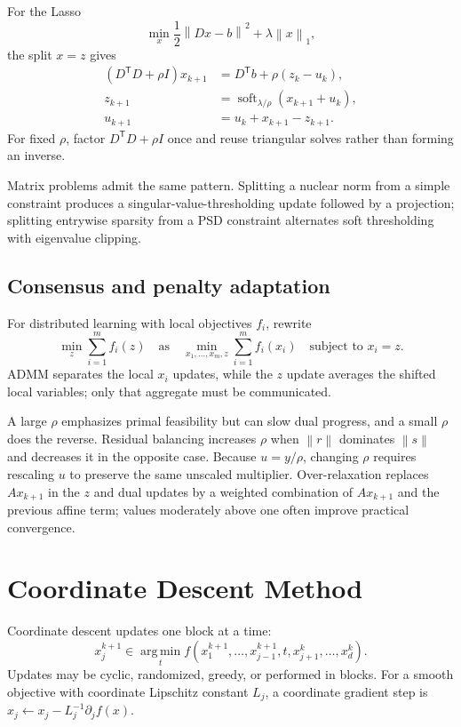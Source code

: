 \documentclass[12pt,oneside]{book}
\numberwithin{equation}{section}
\theoremstyle{definition}
\theoremstyle{plain}
\theoremstyle{remark}
\newcommand{\argmin}{\operatorname*{arg\,min}}
\newcommand{\norm}[1]{\left\lVert #1 \right\rVert}
\begin{document}
For the Lasso
\[
 \min_x\frac12\norm{Dx-b}^2+\lambda\norm{x}_1,
\]
the split $x=z$ gives
\begin{align*}
 (D^\mathsf TD+\rho I)x_{k+1}
 &=D^\mathsf Tb+\rho(z_k-u_k),\\
 z_{k+1}&=\operatorname{soft}_{\lambda/\rho}(x_{k+1}+u_k),\\
 u_{k+1}&=u_k+x_{k+1}-z_{k+1}.
\end{align*}
For fixed $\rho$, factor $D^\mathsf TD+\rho I$ once and reuse triangular
solves rather than forming an inverse.

Matrix problems admit the same pattern. Splitting a nuclear norm from a
simple constraint produces a singular-value-thresholding update followed by
a projection; splitting entrywise sparsity from a PSD constraint alternates
soft thresholding with eigenvalue clipping.

\subsection{Consensus and penalty adaptation}

For distributed learning with local objectives $f_i$, rewrite
\[
 \min_z\sum_{i=1}^m f_i(z)
 \quad\text{as}\quad
 \min_{x_1,\ldots,x_m,z}\sum_{i=1}^m f_i(x_i)
 \quad\text{subject to }x_i=z.
\]
ADMM separates the local $x_i$ updates, while the $z$ update averages the
shifted local variables; only that aggregate must be communicated.

A large $\rho$ emphasizes primal feasibility but can slow dual progress, and
a small $\rho$ does the reverse. Residual balancing increases $\rho$ when
$\norm r$ dominates $\norm s$ and decreases it in the opposite case. Because
$u=y/\rho$, changing $\rho$ requires rescaling $u$ to preserve the same
unscaled multiplier. Over-relaxation replaces $Ax_{k+1}$ in the $z$ and dual
updates by a weighted combination of $Ax_{k+1}$ and the previous affine
term; values moderately above one often improve practical convergence.

\section{Coordinate Descent Method}

Coordinate descent updates one block at a time:
\[
 x_j^{k+1}\in\argmin_t
 f(x_1^{k+1},\ldots,x_{j-1}^{k+1},t,x_{j+1}^k,\ldots,x_d^k).
\]
Updates may be cyclic, randomized, greedy, or performed in blocks. For a
smooth objective with coordinate Lipschitz constant $L_j$, a coordinate
gradient step is
$x_j\leftarrow x_j-L_j^{-1}\partial_jf(x)$.
\end{document}
